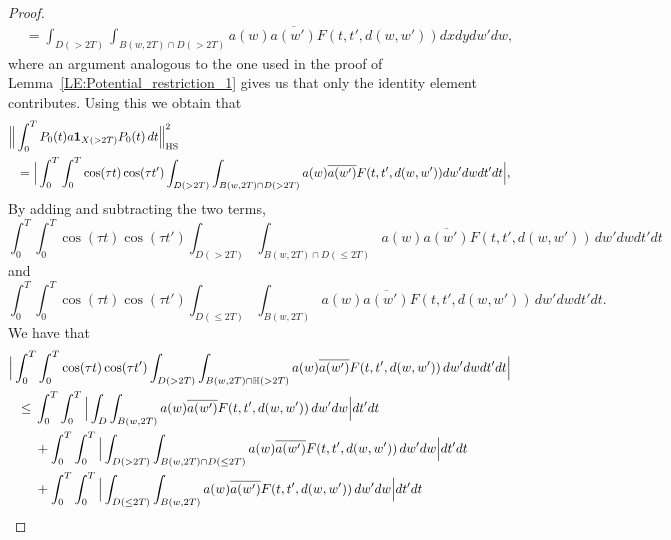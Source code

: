 \documentclass[10pt,a4paper]{amsart}
\newcommand{\bH}{\mathbb{H}}
\newcommand{\bHS}{\mathrm{HS}}
\begin{document}
\begin{proof}
\begin{equation*}
\begin{aligned}
         &=\int_{D( > 2T)}  \int_{B(w,2T)\cap D( > 2T) }  a(w) \overline{a(w')}  F(t,t',d(w, w')) dx dyd w' d w, 
    \end{aligned}
\end{equation*}
where an argument analogous to the one used in the proof of Lemma~\ref{LE:Potential_restriction_1} gives us that only the identity element contributes. Using this we obtain that 
\begin{equation}\label{EQ:free_HS_est_exponential_mixing_1}
    \begin{aligned}
         \MoveEqLeft \Big\lVert \int_0^T  P_0(t) a \boldsymbol{1}_{X( > 2T)} P_0(t) \,d t  \Big\rVert_{\bHS}^2 
         \\
         ={}&\Big| \int_0^T\int_0^T \cos(\tau t) \cos(\tau t') \int_{D( > 2T)}  \int_{B(w,2T)\cap D( > 2T) }  a(w) \overline{a(w')}  F(t,t',d(w,w'))d w' d w      d t'd t\Big|,
    \end{aligned}
\end{equation}
By adding and subtracting the two terms, 
\begin{equation*}
     \int_0^T\int_0^T \cos(\tau t) \cos(\tau t') \int_{D( > 2T)}  \int_{B(w,2T)\cap D( \leq 2T) } a(w) \overline{a(w')} F(t,t',d(w,w'))  \,d w' d w      d t'd t
\end{equation*}
and
\begin{equation*}
     \int_0^T\int_0^T \cos(\tau t) \cos(\tau t') \int_{D( \leq 2T)}  \int_{B(w,2T)} a(w) \overline{a(w')}  F(t,t',d(w,w')) \,d w' d w      d t'd t.
\end{equation*}
We have that
\begin{equation}\label{EQ:free_HS_est_exponential_mixing_3}
    \begin{aligned}
         \MoveEqLeft \Big| \int_0^T\int_0^T \cos(\tau t) \cos(\tau t') \int_{D( > 2T)}  \int_{B(w,2T)\cap \bH( > 2T) } a(w) \overline{a(w')} F(t,t',d(w,w'))  \,d w' d w      d t'd t\Big|
         \\
         \leq {}&  \int_0^T\int_0^T \Big| \int_{D}  \int_{B(w,2T) } a(w) \overline{a(w')}  F(t,t',d(w,w')) \,d w' d w   \Big|   d t'd t
         \\
         &+ \int_0^T\int_0^T \Big| \int_{D( > 2T)}  \int_{B(w,2T)\cap D( \leq 2T) } a(w) \overline{a(w')} F(t,t',d(w,w'))  \,d w' d w    \Big|  d t'd t 
         \\
         &+ \int_0^T\int_0^T \Big| \int_{D( \leq 2T)}  \int_{B(w,2T)} a(w) \overline{a(w')}  F(t,t',d(w,w'))  \,d w' d w  \Big|    d t'd t 
         \\

\end{aligned}
\end{equation}
\end{proof}
\end{document}

